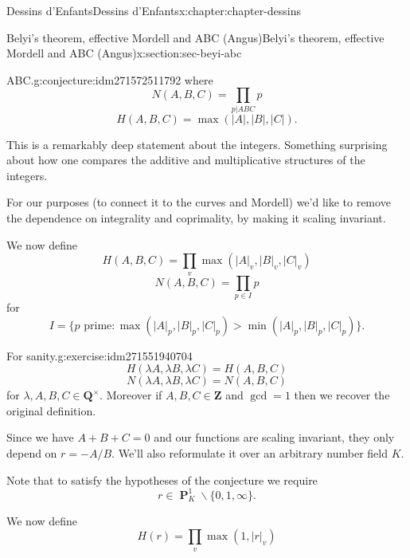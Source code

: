 \documentclass[oneside,10pt,]{book}
\numberwithin{equation}{section}
\newcommand{\units}{^{\times}}
\newcommand{\ZZ}{\mathbf{Z}}
\newcommand{\QQ}{\mathbf{Q}}
\DeclareMathOperator{\PP}{\mathbf{P}}
\newcommand{\gt}{>}
\begin{document}
\begin{chapterptx}{Dessins d'Enfants}{}{Dessins d'Enfants}{}{}{x:chapter:chapter-dessins}
\begin{sectionptx}{Belyi's theorem, effective Mordell and ABC (Angus)}{}{Belyi's theorem, effective Mordell and ABC (Angus)}{}{}{x:section:sec-beyi-abc}
\begin{conjecture}{ABC.}{}{g:conjecture:idm271572511792}
where%
\begin{equation*}
N(A,B,C) =  \prod_{p|ABC} p
\end{equation*}
%
\begin{equation*}
H(A,B,C) = \max(|A|,|B|,|C|)\text{.}
\end{equation*}
%
\end{conjecture}
This is a remarkably deep statement about the integers. Something surprising about how one compares the additive and multiplicative structures of the integers.%
\par
For our purposes (to connect it to the curves and Mordell) we'd like to remove the dependence on integrality and coprimality, by making it scaling invariant.%
\par
We now define%
\begin{equation*}
H(A,B,C) = \prod_{v}\max(|A|_v,|B|_v,|C|_v)
\end{equation*}
%
\begin{equation*}
N(A,B,C) =  \prod_{p\in I} p
\end{equation*}
for%
\begin{equation*}
I = \{p \text{ prime} : \max(|A|_p,|B|_p,|C|_p) \gt \min(|A|_p,|B|_p,|C|_p)\}\text{.}
\end{equation*}
%
\begin{inlineexercise}{For sanity.}{g:exercise:idm271551940704}%
%
\begin{equation*}
H(\lambda A,\lambda B,\lambda C)  = H(A,B,C)
\end{equation*}
%
\begin{equation*}
N(\lambda A,\lambda B,\lambda C)  = N(A,B,C)
\end{equation*}
for \(\lambda, A,B,C \in \QQ\units\). Moreover if \(A,B,C \in \ZZ\) and \(\gcd = 1\) then we recover the original definition.%
\end{inlineexercise}
Since we have \(A+ B+C = 0\) and our functions are scaling invariant, they only depend on \(r=  - A/B\). We'll also reformulate it over an arbitrary number field \(K\).%
\par
Note that to satisfy the hypotheses of the conjecture we require%
\begin{equation*}
r \in \PP^1_K \smallsetminus \{0,1,\infty\}\text{.}
\end{equation*}
%
\par
We now define%
\begin{equation*}
H(r) = \prod_{v}\max(1,|r|_v)
\end{equation*}
%
\begin{equation*}

\end{equation*}
\end{sectionptx}
\end{chapterptx}
\end{document}
